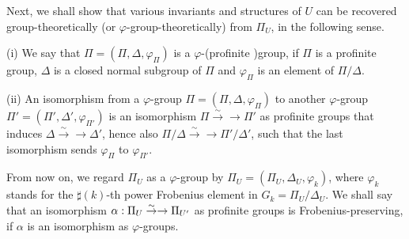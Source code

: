 %
%
%
%
%

Next, we shall show that various 
invariants and structures of $U$ can be recovered 
group-theoretically (or $\varphi$-group-theoretically) from $\Pi_U$, 
in the following sense. 

(i) We say that $\Pi=(\Pi, \Delta, \varphi_\Pi)$ is a 
$\varphi$-(profinite )group, 
if $\Pi$ is a profinite group, $\Delta$ is a closed normal subgroup 
of $\Pi$ and $\varphi_\Pi$ is an element of $\Pi/\Delta$. 

\noindent
(ii) An isomorphism from a $\varphi$-group $\Pi=(\Pi, \Delta, \varphi_\Pi)$ 
to another $\varphi$-group $\Pi'=(\Pi', \Delta', \varphi_{\Pi'})$ is 
an isomorphism $\Pi\overset{\sim}\to{\to}\Pi'$ as profinite groups that 
induces $\Delta \overset{\sim}\to{\to} \Delta'$, 
hence also $\Pi/\Delta \overset{\sim}\to{\to} \Pi'/\Delta'$, such that 
the last isomorphism sends $\varphi_\Pi$ to $\varphi_{\Pi'}$. 
\enddefinition

{}From now on, we regard $\Pi_U$ as a $\varphi$-group by 
$\Pi_U=(\Pi_U, \Delta_U,\varphi_k)$, 
where $\varphi_k$ stands for the $\sharp(k)$-th power Frobenius element 
in $G_k=\Pi_U/\Delta_U$. We shall say that an isomorphism 
$\alpha: \Pi_U\overset \sim \to \rightarrow \Pi_{U'}$ as profinite groups 
is Frobenius-preserving, if $\alpha$ is an isomorphism 
as $\varphi$-groups. 

